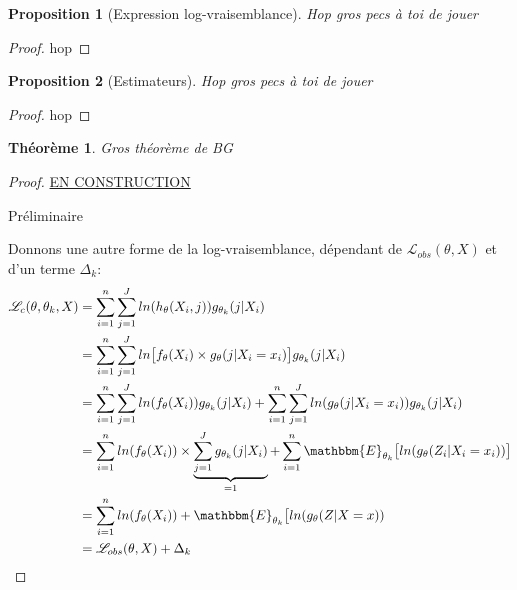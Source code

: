 \documentclass[frenchb]{report}
\newcommand{\1}{\mathbbm{1}}
\newcommand{\E}{\mathbbm{E}}
\newcommand{\lv}{\mathcal{L}}
\newtheorem{prop}{Proposition}
\newtheorem{thm}{Théorème}
\theoremstyle{definition}\newtheorem{defn}{Définition}
\theoremstyle{definition}\newtheorem{exm}{Exemple}
\theoremstyle{definition}\newtheorem{nota}{Notation}
\theoremstyle{definition}\newtheorem{rem}{Remarque}
\begin{document}
\begin{prop}[Expression log-vraisemblance]
Hop gros pecs à toi de jouer
\end{prop}

\begin{proof}
hop
\end{proof}

\begin{prop}[Estimateurs]
Hop gros pecs à toi de jouer
\end{prop}

\begin{proof}
hop
\end{proof}

\begin{thm}
Gros théorème de BG
\end{thm}

\newpage
\begin{proof}
\underline{EN CONSTRUCTION}


Préliminaire \newline

Donnons une autre forme de la log-vraisemblance, dépendant de $\lv_ {obs}(\theta, X)$ et d'un terme $\Delta_k$:
\begin{align*}
\lv_c(\theta, \theta_k, X) &=  \displaystyle\sum_{i=1}^n\sum_{j=1}^J ln(h_\theta(X_i ,j))  g_{\theta_k}(j|X_i)\\
&=  \displaystyle\sum_{i=1}^n\sum_{j=1}^J ln\big[f_\theta(X_i)\times g_\theta(j|X_i=x_i)\big]g_{\theta_k}(j|X_i)\\
&=  \displaystyle\sum_{i=1}^n\sum_{j=1}^J ln(f_\theta(X_i))g_{\theta_k}(j|X_i) + \sum_{i=1}^n\sum_{j=1}^J ln(g_\theta(j|X_i=x_i))g_{\theta_k}(j|X_i)\\
&= \displaystyle\sum_{i=1}^n ln(f_\theta(X_i))\times\underbrace{\sum_{j=1}^J g_{\theta_k}(j|X_i)}_{=1} +\sum_{i=1}^n \E_{\theta_k}\big[ln(g_\theta(Z_i|X_i=x_i)) \big]\\
&= \displaystyle\sum_{i=1}^n ln(f_\theta(X_i)) + \E_{\theta_k}\big[ln(g_\theta(Z|X=x)) \\
&= \lv_{obs}(\theta, X) + \Delta_k
\end{align*}




\end{proof}

\pagebreak



\end{document}
